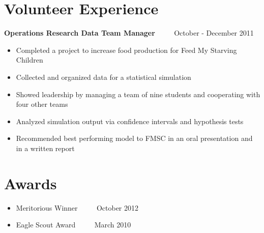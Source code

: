 \documentclass[10pt]{article}
\newenvironment{am}{\begin{addmargin}[1em]{0em}}{\end{addmargin}}
\newcommand{\Experience}[3]{\begin{am}\textbf{#1} \ \ \ \ \emph{{\color{LightGray}{#2}}} \hfill {#3} \end{am}}
\begin{document}




\section*{Volunteer Experience}

\Experience{Operations Research Data Team Manager}{Bethel University Mathematics}{October - December 2011}
\begin{itemize}[noitemsep]
 \item Completed a project to increase food production for Feed My Starving Children
 \item Collected and organized data for a statistical simulation
 \item Showed leadership by managing a team of nine students and cooperating with four other teams
 \item Analyzed simulation output via confidence intervals and hypothesis tests
 \item Recommended best performing model to FMSC in an oral presentation and in a written report
\end{itemize}




\section*{Awards}

\begin{itemize}[noitemsep]
 \item Meritorious Winner  \ \ \ \  \emph{\color{LightGray}{UMN Mathematical Contest in Modeling}} \hfill October 2012
 \item Eagle Scout Award  \ \ \ \  \emph{\color{LightGray}{Boy Scouts of America}} \hfill March 2010
\end{itemize}
\end{document}
